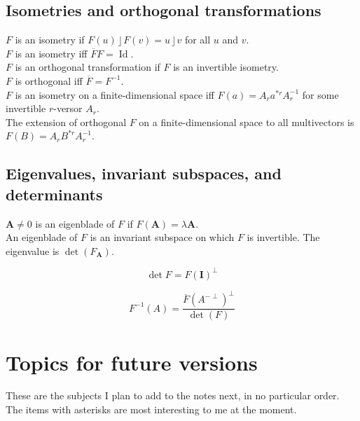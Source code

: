 \documentclass{utarticle}
\newcommand{\bl}[1]{\ensuremath{\bm{#1}}}
\newcommand{\I}{\bl{I}}
\newcommand{\Id}{\operatorname{Id}}
\DeclareMathOperator{\lin}{\rfloor}
\newcommand{\grinv}[2][]{\ensuremath{#2^{*#1}}}
\newcommand{\dual}[1]{\ensuremath{#1^\perp}}
\newcommand{\invdual}[1]{\ensuremath{#1^{-\perp}}}
\newcommand{\adj}[1]{\ensuremath{\overline{#1}}}
\begin{document}
\subsection{Isometries and orthogonal transformations}
\label{app:isoorth}

$F$ is an isometry if $F(u) \lin F(v) = u \lin v$ for all $u$ and $v$. \\

\noindent $F$ is an isometry iff $\adj{F}F = \Id$. \\

\noindent $F$ is an orthogonal transformation if $F$ is an invertible isometry. \\

\noindent $F$ is orthogonal iff $\adj{F} = F^{-1}$. \\

\noindent $F$ is an isometry on a finite-dimensional space iff $F(a) = A_r \grinv[r]{a} A_r^{-1}$ for some invertible $r$-versor $A_r$. \\

\noindent The extension of orthogonal $F$ on a finite-dimensional space to all multivectors is $F(B) = A_r \grinv[r]{B} A_r^{-1}$.

\subsection{Eigenvalues, invariant subspaces, and determinants}
\label{app:eigen}

$\bl{A} \neq 0$ is an eigenblade of $F$ if $F(\bl{A}) = \lambda \bl{A}$. \\

\noindent An eigenblade of $F$ is an invariant subspace on which $F$ is invertible. The eigenvalue is $\det(F_{\bl{A}})$.

\begin{equation} \det F = \dual{F(\I)} \end{equation}

\begin{equation} F^{-1}(A) = \frac{\dual{\adj{F}(\invdual{A})}}{\det(F)} \end{equation}

\section{Topics for future versions}
\label{app:future}

These are the subjects I plan to add to the notes next, in no particular order.  The items with
asterisks are most interesting to me at the moment.
\end{document}
